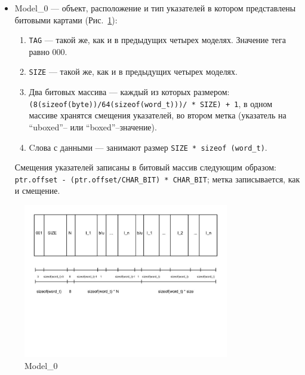 \begin{itemize}
\item Model\_0 --- объект, расположение и тип указателей в котором представлены битовыми картами (Рис.~\ref{third}):
\begin{enumerate}
\item \lstinline{TAG} --- такой же, как и в предыдущих четырех моделях. Значение тега равно 000.
\item \lstinline{SIZE} --- такой же, как и в предыдущих четырех моделях.
\item Два битовых массива ---  каждый из которых размером: \lstinline{(8(sizeof(byte))/64(sizeof(word_t)))/ * SIZE) + 1}, в одном массиве хранятся смещения указателей, во втором метка (указатель на ``uboxed''-- или ``boxed''--значение).
\item Cлова с данными --- занимают размер \lstinline{SIZE * sizeof (word_t)}.
\end{enumerate}
Смещения указателей записаны в битовый массив следующим образом: \lstinline{ptr.offset - (ptr.offset/CHAR_BIT) * CHAR_BIT};
метка записывается, как и смещение.
\end{itemize}
\begin{figure}[h]
\includegraphics[width=0.8\textwidth]{Kren/3}
\caption{Model\_0}
\label{third}
\end{figure}

